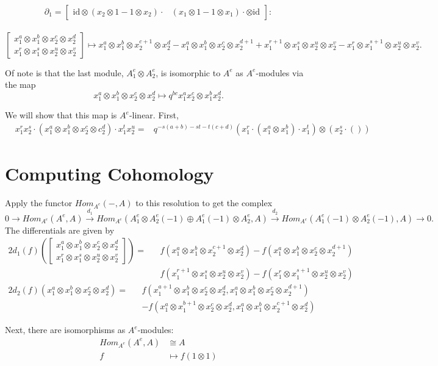 \documentclass[12pt,a4paper]{article}
\newcommand\1{_{(1)}}
\newcommand\2{_{(2)}}
\begin{document}
\newpage
\[\partial_1=\begin{bmatrix}\text{id}\otimes(x_2\otimes 1-1\otimes x_2)\cdot&(x_1\otimes 1-1\otimes x_1)\cdot\otimes\text{id}\end{bmatrix}:\]\\
\[\begin{bmatrix}x_1^a\otimes x_1^b\otimes x_2^c\otimes x_2^d\\x_1^r\otimes x_1^s\otimes x_2^u\otimes x_2^v\end{bmatrix}\mapsto x_1^a\otimes x_1^b\otimes x_2^{c+1}\otimes x_2^d-x_1^a\otimes x_1^b\otimes x_2^c\otimes x_2^{d+1}
+ x_1^{r+1}\otimes x_1^s\otimes x_2^u\otimes x_2^v-x_1^r\otimes x_1^{s+1}\otimes x_2^u\otimes x_2^v.
\]

Of note is that the last module, $A_1^e\otimes A_2^e$, is isomorphic to $A^e$ as $A^e$-modules via the map
\[
x_1^a\otimes x_1^b\otimes x_2^c\otimes x_2^d\mapsto q^{bc} x_1^ax_2^c\otimes x_1^bx_2^d.  
\]

We will show that this map is $A^e$-linear. 
First,
\begin{align*}
&x_1^rx_2^s\cdot(x_1^a\otimes x_1^b\otimes x_2^c\otimes c_2^d)\cdot x_1^tx_2^u=
&q^{-s(a+b)-st-t(c+d)}(x_1^r\cdot(x_1^a\otimes x_1^b)\cdot x_1^t)\otimes(x_2^s\cdot())
\end{align*}

\section{Computing Cohomology}
Apply the functor $Hom_{A^e}(-,A)$ to this resolution to get the complex
\[
0\to Hom_{A^e}(A^e,A)\xrightarrow{d_1} Hom_{A^e}(A_1^e\otimes A_2^e(-1)\oplus A_1^e(-1)\otimes A_2^e,A)\xrightarrow{d_2}Hom_{A^e}(A_1^e(-1)\otimes A_2^e(-1),A)\to 0.  
\]
The differentials are given by
\begin{alignat*}{2}
  d_1(f)\left(\begin{bmatrix}x_1^a\otimes x_1^b\otimes x_2^c\otimes x_2^d\\ x_1^r\otimes x_1^s\otimes x_2^u\otimes x_2^v\end{bmatrix}\right)= &&f(x_1^a\otimes x_1^b\otimes x_2^{c+1}\otimes x_2^d)-f(x_1^a\otimes x_1^b\otimes x_2^c\otimes x_2^{d+1})\\
  && f(x_1^{r+1}\otimes x_1^s\otimes  x_2^u\otimes x_2^v)-f(x_1^r\otimes x_1^{s+1}\otimes x_2^u\otimes x_2^v)
\end{alignat*}  
\begin{alignat*}{2}
  d_2(f)(x_1^a\otimes x_1^b\otimes x_2^c\otimes x_2^d)=&&f(x_1^{a+1}\otimes x_1^b\otimes x_2^c\otimes x_2^d,x_1^a\otimes x_1^b\otimes x_2^c\otimes x_2^{d+1})\\
  &&-f(x_1^a\otimes x_1^{b+1}\otimes x_2^c\otimes x_2^d,x_1^a\otimes x_1^b\otimes x_2^{c+1}\otimes x_2^d)
\end{alignat*}

Next, there are isomorphisms as $A^e$-modules:
\begin{align*}
Hom_{A^e}(A^e,A)&\cong A\\
f&\mapsto f(1\otimes 1)  
\end{align*}
\end{document}
